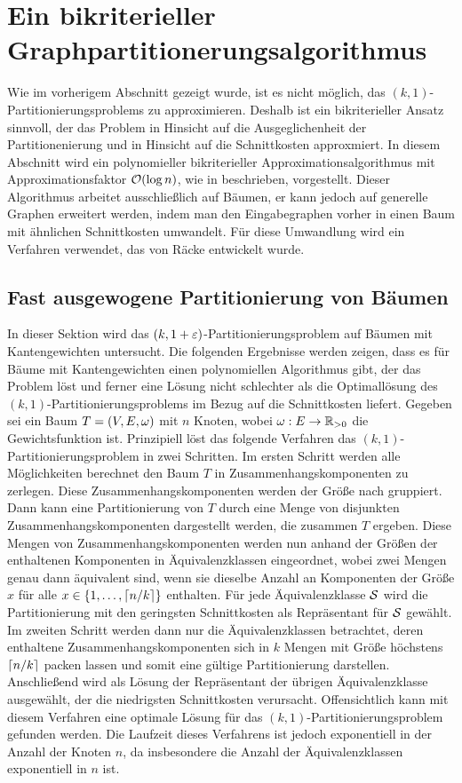 \section{Ein bikriterieller Graphpartitionerungsalgorithmus}
Wie im vorherigem Abschnitt gezeigt wurde, ist es nicht möglich, das $(k,1)$\hyp Partitionierungsproblems zu approximieren. 
Deshalb ist ein bikriterieller Ansatz sinnvoll, der das Problem in Hinsicht auf die Ausgeglichenheit der Partitionenierung und in Hinsicht auf die Schnittkosten approxmiert.
In diesem Abschnitt wird ein polynomieller bikriterieller Approximationsalgorithmus mit Approximationsfaktor $\bigO(\log n)$, wie in \parencite{FF15} beschrieben, vorgestellt.
Dieser Algorithmus arbeitet ausschließlich auf Bäumen, er kann jedoch auf generelle Graphen erweitert werden, indem man den Eingabegraphen vorher in einen Baum mit ähnlichen Schnittkosten umwandelt.
Für diese Umwandlung wird ein Verfahren verwendet, das von Räcke entwickelt wurde. \parencite{rc08}

\subsection{Fast ausgewogene Partitionierung von Bäumen}\label{sec:treepartitioning}
In dieser Sektion wird das $(k,1+\eps)$\hyp Partitionierungsproblem auf Bäumen mit Kantengewichten untersucht. 
Die folgenden Ergebnisse werden zeigen, dass es für Bäume mit Kantengewichten einen polynomiellen Algorithmus gibt, der das Problem löst und ferner eine Lösung nicht schlechter als die Optimallösung des $(k,1)$\hyp Partitionierungsproblems im Bezug auf die Schnittkosten liefert.
Gegeben sei ein Baum $T = (V,E,\weight)$ mit $n$ Knoten, wobei $\weight : E \rightarrow \reals_{> 0}$ die Gewichtsfunktion ist.
Prinzipiell löst das folgende Verfahren das $(k,1)$\hyp Partitionierungsproblem in zwei Schritten.
Im ersten Schritt werden alle Möglichkeiten berechnet den Baum $T$ in Zusammenhangskomponenten zu zerlegen.
Diese Zusammenhangskomponenten werden der Größe nach gruppiert.
Dann kann eine Partitionierung von $T$ durch eine Menge von disjunkten Zusammenhangskomponenten dargestellt werden, die zusammen $T$ ergeben. 
Diese Mengen von Zusammenhangskomponenten werden nun anhand der Größen der enthaltenen Komponenten in Äquivalenzklassen eingeordnet, wobei zwei Mengen genau dann äquivalent sind, wenn sie dieselbe Anzahl an Komponenten der Größe $x$ für alle $x \in \{1, \ldots, \ceil*{n/k}\}$ enthalten.
Für jede Äquivalenzklasse $\calS$ wird die Partitionierung mit den geringsten Schnittkosten als Repräsentant für $\calS$ gewählt.
Im zweiten Schritt werden dann nur die Äquivalenzklassen betrachtet, deren enthaltene Zusammenhangskomponenten sich in $k$ Mengen mit Größe höchstens $\ceil*{n/k}$ packen lassen und somit eine gültige Partitionierung darstellen.
Anschließend wird als Lösung der Repräsentant der übrigen Äquivalenzklasse ausgewählt, der die niedrigsten Schnittkosten verursacht.
Offensichtlich kann mit diesem Verfahren eine optimale Lösung für das $(k,1)$\hyp Partitionierungsproblem gefunden werden.
Die Laufzeit dieses Verfahrens ist jedoch exponentiell in der Anzahl der Knoten $n$, da insbesondere die Anzahl der Äquivalenzklassen exponentiell in $n$ ist.

